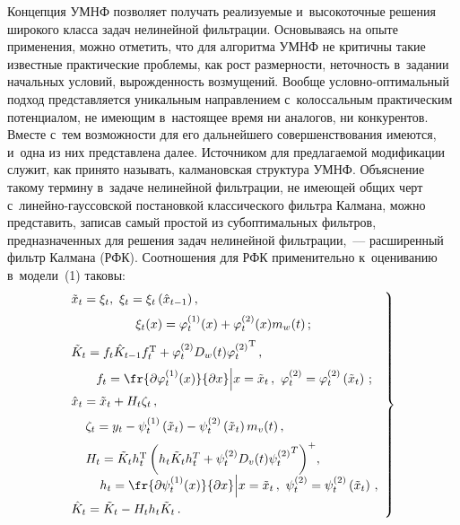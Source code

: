 \begin{multicols}{2}
    Концепция УМНФ позволяет получать реализуемые и~высокоточные 
решения широкого класса задач нелинейной фильтрации. Основываясь на 
опыте применения, можно отметить, что для алгоритма УМНФ не критичны 
такие известные практические проблемы, как рост размерности, неточность 
в~задании начальных условий, вырожденность возмущений. Вообще  
услов\-но-оп\-ти\-маль\-ный подход представляется уникальным направлением 
с~колоссальным практическим потенциалом, не имеющим в~настоящее время 
ни аналогов, ни конкурентов. Вместе с~тем возможности для его дальнейшего 
совершенствования имеются, и~одна из них представлена далее. Источником 
для предлагаемой модификации служит, как принято называть, калмановская 
структура УМНФ. Объяснение такому термину в~задаче нелинейной 
фильтрации, не имеющей общих черт с~ли\-ней\-но-гаус\-сов\-ской постановкой 
классического фильтра Калмана, можно представить, записав самый простой из 
субоптимальных фильтров, предназначенных для решения задач нелинейной 
фильтрации,~--- расширенный фильтр Калмана (РФК). Соотношения для РФК 
применительно к~оцениванию в~модели~(1) таковы:
    \begin{equation}
    \left.
    \begin{array}{l}
   \hspace*{-2mm} \tilde{x}_t=\xi_t,\  \xi_t=\xi_t\left( \hat{x}_{t-1}\right),\\[6pt]
     \hspace*{16mm}\xi_t(x)= \varphi_t^{(1)}(x)+\varphi_t^{(2)}(x) m_w(t)\,;\\[6pt]
   \hspace*{-2mm} \tilde{K}_t=f_t\hat{K}_{t-1} f_t^{\mathrm{T}}+\varphi_t^{(2)} D_w (t) 
{\varphi_t^{(2)}}^{\mathrm{T}}\,,\\[6pt]
\hspace*{5mm} f_t= \fr{\partial \varphi_t^{(1)}(x)} {\partial x}\Big\vert x= 
\tilde{x}_t\,,\ \varphi_t^{(2)}=\varphi_t^{(2)}\left( \tilde{x}_t\right)\,;\\[6pt]
    \hspace*{-2mm}\hat{x}_t=\tilde{x}_t+H_t\zeta_t\,,\\[6pt]
     \hspace*{2mm}\zeta_t= y_t-\psi_t^{(1)}\left( 
\tilde{x}_t\right)-\psi_t^{(2)}\left(\tilde{x}_t\right) m_v(t)\,,\\[6pt]
   \hspace*{2mm} H_t=\tilde{K}_t h_t^{\mathrm{T}} \left( h_t \tilde{K}_t h_t^T +
   \psi_t^{(2)} D_v(t) 
{\psi_t^{(2)}}^T\right)^+\!,\\[6pt] 
   \hspace*{6mm} h_t=\fr{\partial \psi_t^{(1)}(x)}{\partial x}\Big\vert x= \tilde{x}_t\,,\ 
\psi_t^{(2)}=\psi_t^{(2)}\left( \tilde{x}_t\right)\,,\\[6pt]
    \hspace*{-2mm}\hat{K}_t=\tilde{K}_t-H_t h_t \tilde{K}_t\,.
    \end{array}
    \right\}
    \label{e7-bos}
    \end{equation}
    

\end{multicols}
